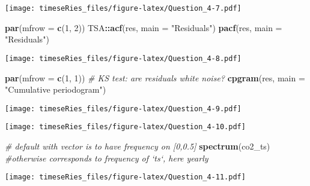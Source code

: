 \documentclass[]{book}
\newenvironment{Shaded}{\begin{snugshade}}{\end{snugshade}}
\newcommand{\CommentTok}[1]{\textcolor[rgb]{0.56,0.35,0.01}{\textit{#1}}}
\newcommand{\DataTypeTok}[1]{\textcolor[rgb]{0.13,0.29,0.53}{#1}}
\newcommand{\DecValTok}[1]{\textcolor[rgb]{0.00,0.00,0.81}{#1}}
\newcommand{\KeywordTok}[1]{\textcolor[rgb]{0.13,0.29,0.53}{\textbf{#1}}}
\newcommand{\NormalTok}[1]{#1}
\newcommand{\OperatorTok}[1]{\textcolor[rgb]{0.81,0.36,0.00}{\textbf{#1}}}
\newcommand{\StringTok}[1]{\textcolor[rgb]{0.31,0.60,0.02}{#1}}
\begin{document}
\texttt{[image: timeseRies\_files/figure-latex/Question\_4-7.pdf]}

\begin{Shaded}
\begin{Highlighting}[]
\KeywordTok{par}\NormalTok{(}\DataTypeTok{mfrow =} \KeywordTok{c}\NormalTok{(}\DecValTok{1}\NormalTok{, }\DecValTok{2}\NormalTok{))}
\NormalTok{TSA}\OperatorTok{::}\KeywordTok{acf}\NormalTok{(res, }\DataTypeTok{main =} \StringTok{"Residuals"}\NormalTok{)}
\KeywordTok{pacf}\NormalTok{(res, }\DataTypeTok{main =} \StringTok{"Residuals"}\NormalTok{)}
\end{Highlighting}
\end{Shaded}

\texttt{[image: timeseRies\_files/figure-latex/Question\_4-8.pdf]}

\begin{Shaded}
\begin{Highlighting}[]
\KeywordTok{par}\NormalTok{(}\DataTypeTok{mfrow =} \KeywordTok{c}\NormalTok{(}\DecValTok{1}\NormalTok{, }\DecValTok{1}\NormalTok{))}
\CommentTok{# KS test: are residuals white noise?}
\KeywordTok{cpgram}\NormalTok{(res, }\DataTypeTok{main =} \StringTok{"Cumulative periodogram"}\NormalTok{)}
\end{Highlighting}
\end{Shaded}

\texttt{[image: timeseRies\_files/figure-latex/Question\_4-9.pdf]}

\begin{Shaded}
\end{Shaded}

\texttt{[image: timeseRies\_files/figure-latex/Question\_4-10.pdf]}

\begin{Shaded}
\begin{Highlighting}[]
\CommentTok{# default with vector is to have frequency on [0,0.5]}
\KeywordTok{spectrum}\NormalTok{(co2_ts)  }\CommentTok{#otherwise corresponds to frequency of `ts`, here yearly}
\end{Highlighting}
\end{Shaded}

\texttt{[image: timeseRies\_files/figure-latex/Question\_4-11.pdf]}
\end{document}
